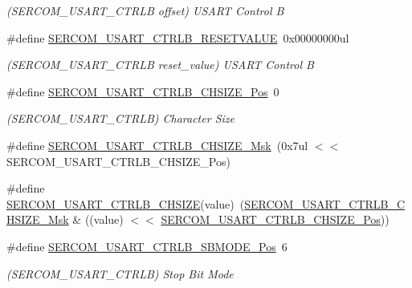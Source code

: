 \begin{DoxyCompactItemize}
\begin{DoxyCompactList}\small\item\em (S\+E\+R\+C\+O\+M\+\_\+\+U\+S\+A\+R\+T\+\_\+\+C\+T\+R\+LB offset) U\+S\+A\+RT Control B \end{DoxyCompactList}\item 
\#define \mbox{\hyperlink{group___s_a_m_d21___s_e_r_c_o_m_ga5f96cd1e2c3802c55743228fabc524cc}{S\+E\+R\+C\+O\+M\+\_\+\+U\+S\+A\+R\+T\+\_\+\+C\+T\+R\+L\+B\+\_\+\+R\+E\+S\+E\+T\+V\+A\+L\+UE}}~0x00000000ul
\begin{DoxyCompactList}\small\item\em (S\+E\+R\+C\+O\+M\+\_\+\+U\+S\+A\+R\+T\+\_\+\+C\+T\+R\+LB reset\+\_\+value) U\+S\+A\+RT Control B \end{DoxyCompactList}\item 
\#define \mbox{\hyperlink{group___s_a_m_d21___s_e_r_c_o_m_ga90b481f2faa23fa9beea38ee7dcce94d}{S\+E\+R\+C\+O\+M\+\_\+\+U\+S\+A\+R\+T\+\_\+\+C\+T\+R\+L\+B\+\_\+\+C\+H\+S\+I\+Z\+E\+\_\+\+Pos}}~0
\begin{DoxyCompactList}\small\item\em (S\+E\+R\+C\+O\+M\+\_\+\+U\+S\+A\+R\+T\+\_\+\+C\+T\+R\+LB) Character Size \end{DoxyCompactList}\item 
\#define \mbox{\hyperlink{group___s_a_m_d21___s_e_r_c_o_m_gafaa677a5d49f8fc8912907e164f03dab}{S\+E\+R\+C\+O\+M\+\_\+\+U\+S\+A\+R\+T\+\_\+\+C\+T\+R\+L\+B\+\_\+\+C\+H\+S\+I\+Z\+E\+\_\+\+Msk}}~(0x7ul $<$$<$ S\+E\+R\+C\+O\+M\+\_\+\+U\+S\+A\+R\+T\+\_\+\+C\+T\+R\+L\+B\+\_\+\+C\+H\+S\+I\+Z\+E\+\_\+\+Pos)
\item 
\#define \mbox{\hyperlink{group___s_a_m_d21___s_e_r_c_o_m_gaf89948d194e1940fd23d187a09a2126c}{S\+E\+R\+C\+O\+M\+\_\+\+U\+S\+A\+R\+T\+\_\+\+C\+T\+R\+L\+B\+\_\+\+C\+H\+S\+I\+ZE}}(value)~(\mbox{\hyperlink{group___s_a_m_d21___s_e_r_c_o_m_gafaa677a5d49f8fc8912907e164f03dab}{S\+E\+R\+C\+O\+M\+\_\+\+U\+S\+A\+R\+T\+\_\+\+C\+T\+R\+L\+B\+\_\+\+C\+H\+S\+I\+Z\+E\+\_\+\+Msk}} \& ((value) $<$$<$ \mbox{\hyperlink{group___s_a_m_d21___s_e_r_c_o_m_ga90b481f2faa23fa9beea38ee7dcce94d}{S\+E\+R\+C\+O\+M\+\_\+\+U\+S\+A\+R\+T\+\_\+\+C\+T\+R\+L\+B\+\_\+\+C\+H\+S\+I\+Z\+E\+\_\+\+Pos}}))
\item 
\#define \mbox{\hyperlink{group___s_a_m_d21___s_e_r_c_o_m_ga9cb2bda1f98dbb34f0b89a3fe55975c5}{S\+E\+R\+C\+O\+M\+\_\+\+U\+S\+A\+R\+T\+\_\+\+C\+T\+R\+L\+B\+\_\+\+S\+B\+M\+O\+D\+E\+\_\+\+Pos}}~6
\begin{DoxyCompactList}\small\item\em (S\+E\+R\+C\+O\+M\+\_\+\+U\+S\+A\+R\+T\+\_\+\+C\+T\+R\+LB) Stop Bit Mode \end{DoxyCompactList}\item 

\end{DoxyCompactItemize}
